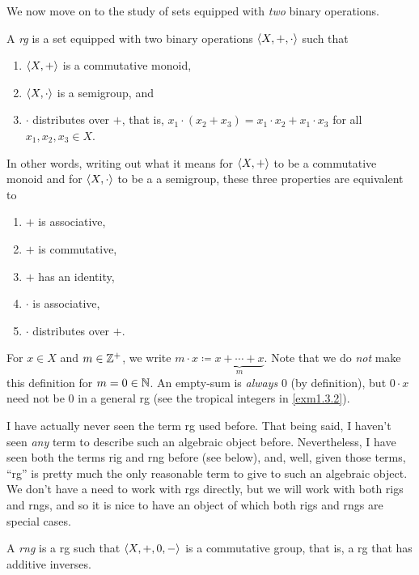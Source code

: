 We now move on to the study of sets equipped with \emph{two} binary operations.
\begin{dfn}[Rg]
A \emph{rg} is a set equipped with two binary operations $\langle X,+,\cdot\rangle$ such that
\begin{enumerate}
\item $\langle X,+\rangle$ is a commutative monoid,
\item $\langle X,\cdot\rangle$ is a semigroup, and
\item $\cdot$ distributes over $+$, that is, $x_1\cdot (x_2+x_3)=x_1\cdot x_2+x_1\cdot x_3$ for all $x_1,x_2,x_3\in X$.
\end{enumerate}
\begin{rmk}
In other words, writing out what it means for $\langle X,+\rangle$ to be a commutative monoid and for $\langle X,\cdot\rangle$ to be a a semigroup, these three properties are equivalent to
\begin{enumerate}
\item $+$ is associative,
\item $+$ is commutative,
\item $+$ has an identity,
\item $\cdot$ is associative,
\item $\cdot$ distributes over $+$.
\end{enumerate}
\end{rmk}
\begin{rmk}
For $x\in X$ and $m\in \mathbb{Z} ^+$, we write $m\cdot x\coloneqq \underbrace{x+\cdots +x}_{m}$.  Note that we do \emph{not} make this definition for $m=0\in \mathbb{N}$.  An empty-sum is \emph{always} $0$ (by definition), but $0\cdot x$ need not be $0$ in a general rg (see the tropical integers in \cref{exm1.3.2}).
\end{rmk}
\begin{rmk}
I have actually never seen the term rg used before.  That being said, I haven't seen \emph{any} term to describe such an algebraic object before.  Nevertheless, I have seen both the terms rig and rng before (see below), and, well, given those terms, ``rg'' is pretty much the only reasonable term to give to such an algebraic object.  We don't have a need to work with rgs directly, but we will work with both rigs and rngs, and so it is nice to have an object of which both rigs and rngs are special cases.
\end{rmk}
\end{dfn}
\begin{dfn}[Rng]\label{dfnA.1.86}
A \emph{rng} is a rg such that $\langle X,+,0,-\rangle$ is a commutative group, that is, a rg that has additive inverses.
\end{dfn}
